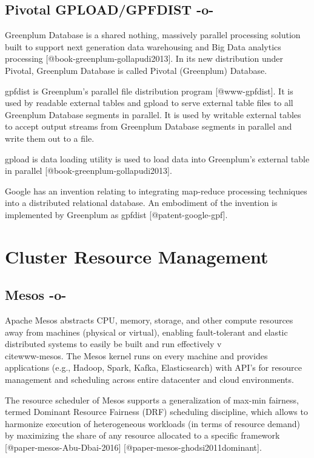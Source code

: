 \subsection{Pivotal GPLOAD/GPFDIST -o-}

Greenplum Database is a shared nothing, massively parallel processing
solution built to support next generation data warehousing and Big
Data analytics processing [@book-greenplum-gollapudi2013]. In its
new distribution under Pivotal, Greenplum Database is called Pivotal
(Greenplum) Database.

gpfdist is Greenplum's parallel file distribution
program [@www-gpfdist]. It is used by readable external tables and
gpload to serve external table files to all Greenplum Database
segments in parallel. It is used by writable external tables to accept
output streams from Greenplum Database segments in parallel and write
them out to a file.

gpload is data loading utility is used to load data into Greenplum's
external table in parallel [@book-greenplum-gollapudi2013].

Google has an invention relating to integrating map-reduce processing
techniques into a distributed relational database. An embodiment of
the invention is implemented by Greenplum as
gpfdist [@patent-google-gpf].



\section{Cluster Resource Management}


\subsection{Mesos -o-}

Apache Mesos abstracts CPU, memory, storage, and other compute
resources away from machines (physical or virtual), enabling
fault-tolerant and elastic distributed systems to easily be built and
run effectively v\\cite{www-mesos}.  The Mesos kernel runs on every
machine and provides applications (e.g., Hadoop, Spark, Kafka,
Elasticsearch) with API's for resource management and scheduling
across entire datacenter and cloud environments.

The resource scheduler of Mesos supports a generalization of max-min
fairness, termed Dominant Resource Fairness (DRF) scheduling
discipline, which allows to harmonize execution of heterogeneous
workloads (in terms of resource demand) by maximizing the share of any
resource allocated to a specific framework
[@paper-mesos-Abu-Dbai-2016]
[@paper-mesos-ghodsi2011dominant].
     
